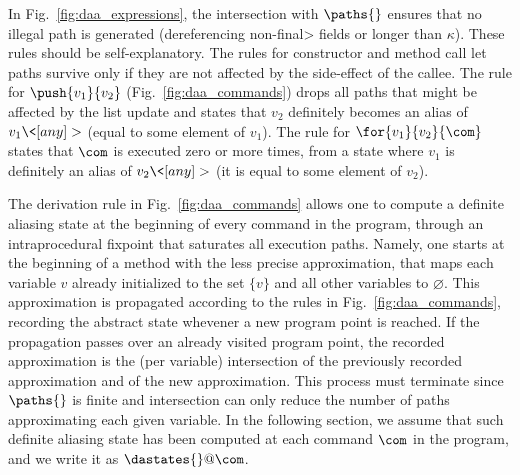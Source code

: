 %
In Fig.~\ref{fig:daa_expressions},
the intersection with $\paths{}$ ensures that no illegal path
is generated (\ieinitial dereferencing non-\<final> fields or longer than $\kappa$).
These rules should be self-explanatory. The rules for constructor and method call
let paths survive only if they are not affected by the side-effect of the callee.
The rule for $\push{v_1}{v_2}$ (Fig.~\ref{fig:daa_commands}) drops all paths that
might be affected by the list update and states that $v_2$ definitely becomes an alias
of $v_1\<[any]>$ (\ieinitial equal to some element of $v_1$).
The rule for $\for{v_1}{v_2}{\com}$ states that $\com$ is executed zero or more times,
from a state where $v_1$ is definitely an alias of $v_2\<[any]>$ (\ieinitial it is
equal to some element of $v_2$).

The derivation rule in Fig.~\ref{fig:daa_commands} allows one to compute a definite
aliasing state at the beginning of every command in the program, through an
intraprocedural fixpoint that saturates all execution paths. Namely, one starts at
the beginning of a method with the less precise approximation, that maps each variable
$v$ already initialized to the set $\{v\}$ and all other variables to $\varnothing$.
This approximation is propagated according to the rules
in Fig.~\ref{fig:daa_commands}, recording the abstract state
whevener a new program point is
reached. If the propagation passes over an already visited program point, the
recorded approximation is the (per variable) intersection of the previously recorded
approximation and of the new approximation. This process must terminate
since $\paths{}$ is finite
and intersection can only reduce the number of paths approximating each given variable.
In the following section, we assume that such definite
aliasing state has been computed
at each command $\com$ in the program, and we write it as $\dastates{}@\com$.

